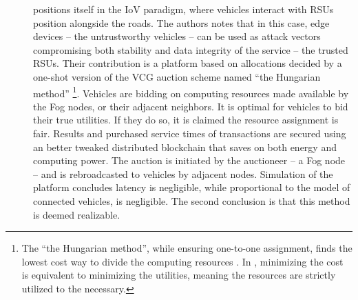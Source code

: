 \documentclass[11pt]{sdm}
\begin{document}
\begin{description}
	\item[\citet{lee_trustful_2020}] positions itself in the \gls{IoV} paradigm, where vehicles interact with \glspl{RSU} position alongside the roads. The authors notes that in this case, edge devices -- the untrustworthy vehicles -- can be used as attack vectors compromising both stability and data integrity of the service -- the trusted \glspl{RSU}. Their contribution is a platform based on allocations decided by a one-shot version of the \gls{VCG} auction scheme named ``the Hungarian method'' \footnote{The ``the Hungarian method'', while ensuring one-to-one assignment, finds the lowest cost way to divide the computing resources \cite{wikipedia_hungarian_2021}. In \cite{lee_trustful_2020}, minimizing the cost is equivalent to minimizing the utilities, meaning the resources are strictly utilized to the necessary.}. Vehicles are bidding on computing resources made available by the Fog nodes, or their adjacent neighbors. It is optimal for vehicles to bid their true utilities. If they do so, it is claimed the resource assignment is fair. Results and purchased service times of transactions are secured using an better tweaked distributed blockchain that saves on both energy and computing power. The auction is initiated by the auctioneer -- a Fog node -- and is rebroadcasted to vehicles by adjacent nodes. Simulation of the platform concludes latency is negligible, while proportional to the model of connected vehicles, is negligible. The second conclusion is that this method is deemed realizable.
	

\end{description}
\end{document}
